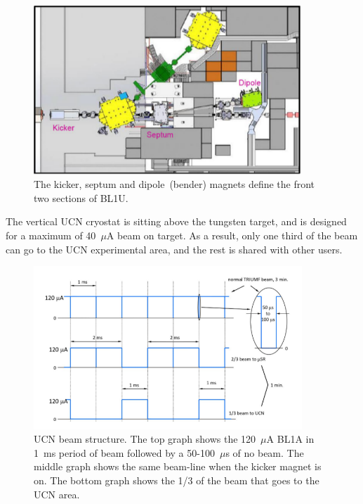 \begin{figure}[h!]
  \centering
  \includegraphics[width=0.9\textwidth]{magnets.png}
  \caption{The kicker, septum and dipole~(bender) magnets define the
    front two sections of BL1U.}
  \label{fig:magnets}
\end{figure}
The vertical UCN cryostat is sitting above the tungsten target, and is
designed for a maximum of 40~$\mu$A beam on target. As a result, only
one third of the beam can go to the UCN experimental area, and the rest
is shared with other users.

\begin{figure}[h!]
  \centering
  \includegraphics[width=0.9\textwidth]{bl1u.png}
  \caption{UCN beam structure. The top graph shows the 120~$\mu$A BL1A
    in 1~ms period of beam followed by a 50-100~$\mu$s of no
    beam. The middle graph shows the same beam-line when the kicker
    magnet is on. The bottom graph shows the 1/3 of the beam that goes
    to the UCN area.}
  \label{fig:bl1u}
\end{figure}

